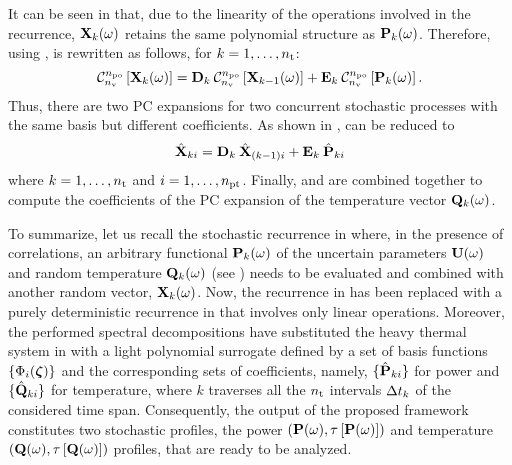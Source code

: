 It can be seen in  that, due to the linearity of the operations involved in the recurrence, $\mathbf{X}_k(\omega)$ retains the same polynomial structure as $\mathbf{P}_k(\omega)$. Therefore, using ,  is rewritten as follows, for $k = 1, \dotsc, {n_\text{t}}$:
\begin{equation} \elabel{expanded-recurrence}
  \oPC{\nvars}{\pcorder}{\vX_k(\o)} = \mCF_k \: \oPC{\nvars}{\pcorder}{\vX_{k-1}(\o)} + \mCS_k \: \oPC{\nvars}{\pcorder}{\vP_k(\o)}.
\end{equation}
Thus, there are two PC expansions for two concurrent stochastic processes with the same basis but different coefficients. As shown in ,  can be reduced to
\begin{equation} \elabel{pc-recurrence}
  \pcc{\vX}_{ki} = \mCF_k \: \pcc{\vX}_{(k - 1)i} + \mCS_k \: \pcc{\vP}_{ki}
\end{equation}
where $k = 1, \dotsc, {n_\text{t}}$ and $i = 1, \dotsc, {n_\text{pt}}$. Finally,  and  are combined together to compute the coefficients of the PC expansion of the temperature vector $\mathbf{Q}_k(\omega)$.

To summarize, let us recall the stochastic recurrence in  where, in the presence of correlations, an arbitrary functional $\mathbf{P}_k(\omega)$ of the uncertain parameters $\mathbf{U}(\omega)$ and random temperature $\mathbf{Q}_k(\omega)$ (see ) needs to be evaluated and combined with another random vector, $\mathbf{X}_k(\omega)$. Now, the recurrence in  has been replaced with a purely deterministic recurrence in  that involves only linear operations. Moreover, the performed spectral decompositions have substituted the heavy thermal system in  with a light polynomial surrogate defined by a set of basis functions $\{ \Phi_i(\boldsymbol{\zeta}) \}$ and the corresponding sets of coefficients, namely, $\{ \hat{\mathbf{P}}_{ki} \}$ for power and $\{ \hat{\mathbf{Q}}_{ki} \}$ for temperature, where $k$ traverses all the ${n_\text{t}}$ intervals $\Delta t_k$ of the considered time span. Consequently, the output of the proposed framework constitutes two stochastic profiles, the power $\profP{\o}$ and temperature $\profT{\o}$ profiles, that are ready to be analyzed.
